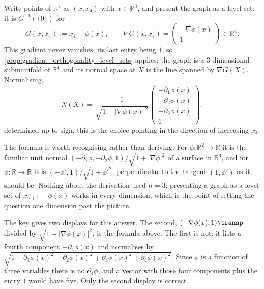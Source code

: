\begin{exercisesolution}
\label{sol:box_normal_to_a_graph_in_r4}
Write points of $\mathbb{R}^4$ as $(x,x_4)$ with $x \in \mathbb{R}^3$, and present the graph as a
level set: it is $G^{-1}(\{0\})$ for
\[G(x,x_4) := x_4 - \phi(x), \qquad
  \nabla G(x,x_4) = \begin{pmatrix} -\nabla\phi(x) \\ 1 \end{pmatrix} \in \mathbb{R}^4 .\]
This gradient never vanishes, its last entry being $1$, so
\cref{prop:gradient_orthogonality_level_sets} applies: the graph is a $3$-dimensional submanifold
of $\mathbb{R}^4$ and its normal space at $X$ is the line spanned by $\nabla G(X)$. Normalising,
\[N(X) = \frac{1}{\sqrt{1+\lvert\nabla\phi(x)\rvert^2}}
  \begin{pmatrix} -\partial_1\phi(x) \\ -\partial_2\phi(x) \\ -\partial_3\phi(x) \\ 1
  \end{pmatrix},\]
determined up to sign; this is the choice pointing in the direction of increasing $x_4$.

The formula is worth recognising rather than deriving. For $\phi : \mathbb{R}^2 \to \mathbb{R}$
it is the familiar unit normal $(-\partial_1\phi,-\partial_2\phi,1)/\sqrt{1+\lvert\nabla\phi
\rvert^2}$ of a surface in $\mathbb{R}^3$, and for $\phi : \mathbb{R} \to \mathbb{R}$ it is
$(-\phi',1)/\sqrt{1+\phi'^2}$, perpendicular to the tangent $(1,\phi')$ as it should be. Nothing
about the derivation used $n = 3$; presenting a graph as a level set of $x_{n+1} - \phi(x)$ works
in every dimension, which is the point of setting the question one dimension past the picture.

\begin{ainote}
The key gives two displays for this answer. The second, $(-\nabla\phi(x),1)\transp$ divided by
$\sqrt{1+\lvert\nabla\phi(x)\rvert^2}$, is the formula above. The first is not: it lists a fourth
component $-\partial_4\phi(x)$ and normalises by
$\sqrt{1+\partial_1\phi(x)^2+\partial_2\phi(x)^2+\partial_3\phi(x)^2+\partial_4\phi(x)^2}$. Since
$\phi$ is a function of three variables there is no $\partial_4\phi$, and a vector with those
four components plus the entry $1$ would have five. Only the second display is correct.
\end{ainote}
\end{exercisesolution}

